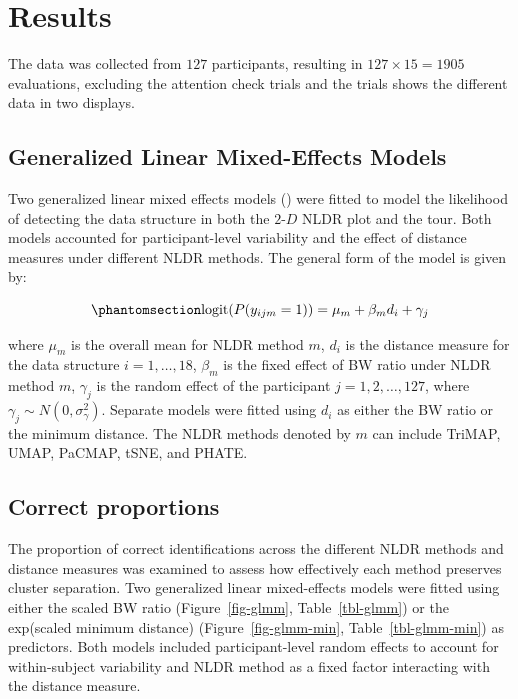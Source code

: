 \documentclass[
  11pt,
  a4paper,
]{report}
\newcommand\gD{$2\text{-}D$}
\begin{document}
\section{Results}\label{sec-results}

The data was collected from \(127\) participants, resulting in
\(127 \times 15 = 1905\) evaluations, excluding the attention check
trials and the trials shows the different data in two displays.

\subsection{Generalized Linear Mixed-Effects
Models}\label{generalized-linear-mixed-effects-models}

Two generalized linear mixed effects models
() were fitted to
model the likelihood of detecting the data structure in both the \gD{}
NLDR plot and the tour. Both models accounted for participant-level
variability and the effect of distance measures under different NLDR
methods. The general form of the model is given by:

\begin{equation}\phantomsection\label{eq-equation1}{\text{logit}(P(y_{ijm} = 1)) = \mu_{m} + \beta_{m} d_{i} + \gamma_{j}}\end{equation}

where \(\mu_{m}\) is the overall mean for NLDR method \(m\), \(d_i\) is
the distance measure for the data structure \(i = 1, \dots, 18\),
\(\beta_m\) is the fixed effect of BW ratio under NLDR method \(m\),
\(\gamma_j\) is the random effect of the participant
\(j = 1, 2, \dots, 127\), where \(\gamma_j \sim N(0, \sigma_\gamma^2)\).
Separate models were fitted using \(d_i\) as either the BW ratio or the
minimum distance. The NLDR methods denoted by \(m\) can include TriMAP,
UMAP, PaCMAP, tSNE, and PHATE.

\subsection{Correct proportions}\label{correct-proportions}

The proportion of correct identifications across the different NLDR
methods and distance measures was examined to assess how effectively
each method preserves cluster separation. Two generalized linear
mixed-effects models were fitted using either the scaled BW ratio
(Figure~\ref{fig-glmm}, Table~\ref{tbl-glmm}) or the exp(scaled minimum
distance) (Figure~\ref{fig-glmm-min}, Table~\ref{tbl-glmm-min}) as
predictors. Both models included participant-level random effects to
account for within-subject variability and NLDR method as a fixed factor
interacting with the distance measure.
\end{document}
